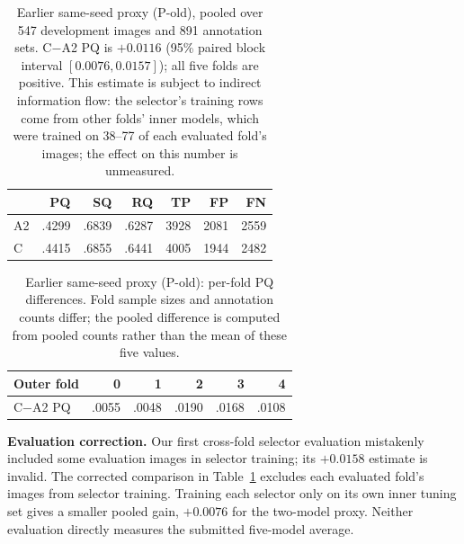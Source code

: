 \documentclass[sigconf]{acmart}
\begin{document}
\begin{table}[t]\centering\small
\begin{tabular}{lrrrrrr}\toprule
 & PQ & SQ & RQ & TP & FP & FN\\\midrule
A2 & .4299 & .6839 & .6287 & 3928 & 2081 & 2559\\
C & .4415 & .6855 & .6441 & 4005 & 1944 & 2482\\\bottomrule
\end{tabular}
\caption{Earlier same-seed proxy (P-old), pooled over 547 development images and 891 annotation sets. C$-$A2 PQ is $+0.0116$ (95\% paired block interval $[0.0076,0.0157]$); all five folds are positive. This estimate is subject to indirect information flow: the selector's training rows come from other folds' inner models, which were trained on 38--77 of each evaluated fold's images; the effect on this number is unmeasured.}\label{tab:results}
\end{table}

\begin{table}[t]\centering\small
\begin{tabular}{lrrrrr}\toprule
Outer fold & 0 & 1 & 2 & 3 & 4\\\midrule
C$-$A2 PQ & .0055 & .0048 & .0190 & .0168 & .0108\\\bottomrule
\end{tabular}
\caption{Earlier same-seed proxy (P-old): per-fold PQ differences. Fold sample sizes and annotation counts differ; the pooled difference is computed from pooled counts rather than the mean of these five values.}\label{tab:folds}
\end{table}

\textbf{Evaluation correction.} Our first cross-fold selector evaluation mistakenly included some evaluation images in selector training; its $+0.0158$ estimate is invalid. The corrected comparison in Table~\ref{tab:results} excludes each evaluated fold's images from selector training. Training each selector only on its own inner tuning set gives a smaller pooled gain, $+0.0076$ for the two-model proxy. Neither evaluation directly measures the submitted five-model average.
\end{document}

